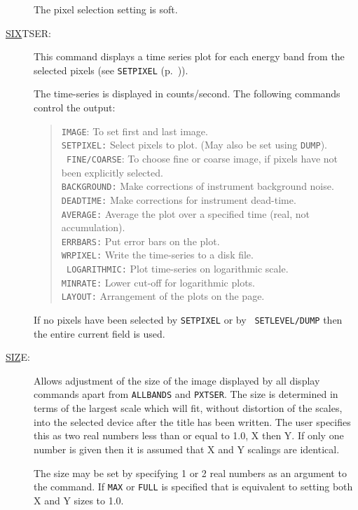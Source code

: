 \begin{description}
The pixel selection setting is soft.

\item[\underline{SIX}TSER: ] \label{six}
This command displays a time series plot for each energy band from the
selected pixels (see {\tt SETPIXEL} (p.~\pageref{setp})).

The time-series is displayed in counts/second. The following commands
control the output:
\begin{quote}
{\tt IMAGE}: To set first and last image.\\ {\tt SETPIXEL:} Select
pixels to plot. (May also be set using {\tt DUMP}).\\ {\tt
FINE/COARSE}: To choose fine or coarse image, if pixels have not been
explicitly selected.\\ {\tt BACKGROUND:} Make corrections of instrument
background noise.\\ {\tt DEADTIME:} Make corrections for instrument
dead-time.\\ {\tt AVERAGE:} Average the plot over a specified time
(real, not accumulation).\\ {\tt ERRBARS:} Put error bars on the
plot.\\ {\tt WRPIXEL:} Write the time-series to a disk file.\\ {\tt
LOGARITHMIC:} Plot time-series on logarithmic scale.\\ {\tt MINRATE:}
Lower cut-off for logarithmic plots.\\ {\tt LAYOUT:} Arrangement of the
plots on the page.
\end{quote}

If no pixels have been selected by {\tt SETPIXEL} or by {\tt
SETLEVEL/DUMP} then the entire current field is used.

\item[\underline{SIZ}E: ] \label{siz}
Allows adjustment of the size of the image displayed by all display
commands apart from {\tt ALLBANDS} and {\tt PXTSER}.  The size is
determined in terms of the largest scale which will fit, without
distortion of the scales, into the selected device after the title has
been written.  The user specifies this as two real numbers less than or
equal to 1.0, X then Y. If only one number is given then it is assumed
that X and Y scalings are identical.

The size may be set by specifying 1 or 2 real numbers as an argument to
the command. If {\tt MAX} or {\tt FULL} is specified that is equivalent
to setting both X and Y sizes to 1.0.


\end{description}
